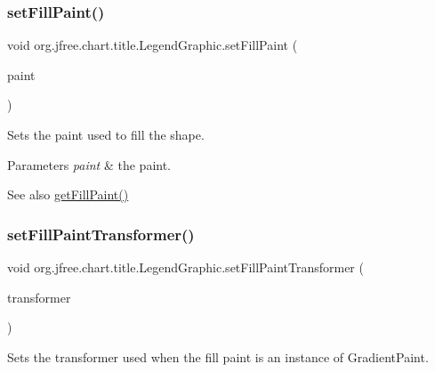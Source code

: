 \subsubsection{\texorpdfstring{set\+Fill\+Paint()}{setFillPaint()}}
{\footnotesize\ttfamily void org.\+jfree.\+chart.\+title.\+Legend\+Graphic.\+set\+Fill\+Paint (\begin{DoxyParamCaption}\item[{Paint}]{paint }\end{DoxyParamCaption})}

Sets the paint used to fill the shape.


\begin{DoxyParams}{Parameters}
{\em paint} & the paint.\\
\hline
\end{DoxyParams}
\begin{DoxySeeAlso}{See also}
\mbox{\hyperlink{classorg_1_1jfree_1_1chart_1_1title_1_1_legend_graphic_aa60ec88ec6d9bf1897d052aed4ca688a}{get\+Fill\+Paint()}} 
\end{DoxySeeAlso}
\mbox{\label{classorg_1_1jfree_1_1chart_1_1title_1_1_legend_graphic_ae89deacb22526a33371d0b781ac13a62}} 
\subsubsection{\texorpdfstring{set\+Fill\+Paint\+Transformer()}{setFillPaintTransformer()}}
{\footnotesize\ttfamily void org.\+jfree.\+chart.\+title.\+Legend\+Graphic.\+set\+Fill\+Paint\+Transformer (\begin{DoxyParamCaption}\item[{Gradient\+Paint\+Transformer}]{transformer }\end{DoxyParamCaption})}

Sets the transformer used when the fill paint is an instance of {\ttfamily Gradient\+Paint}.


